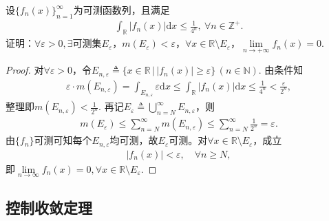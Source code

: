 \documentclass[../../main.tex]{subfiles}%
\begin{document}
\begin{example}
设$\{f_n(x)\}_{n=1}^{\infty}$为可测函数列，且满足
\begin{align*}
\int_{\mathbb{R}} |f_n(x)| \mathrm{d}x \leqslant \frac{1}{4^n},\ \forall n\in \mathbb{Z}^+.
\end{align*}
证明：$\forall \varepsilon>0,\exists$可测集$E_\varepsilon$，$m(E_\varepsilon)<\varepsilon$，$\forall x\in \mathbb{R}\setminus E_\varepsilon$，$\lim\limits_{n\to+\infty} f_n(x)=0.$
\end{example}
\begin{proof}

对$\forall \varepsilon>0$，令$E_{n,\varepsilon}\triangleq \big\{x\in\mathbb{R}\,\big|\,|f_n(x)|\geqslant \varepsilon\big\}\,(n\in\mathbb{N}).$
由条件知
\begin{align*}
\varepsilon\cdot m(E_{n,\varepsilon})=\int_{E_{n,\varepsilon}} \varepsilon \mathrm{d}x \leqslant \int_{\mathbb{R}} |f_n(x)|\mathrm{d}x \leqslant \frac{1}{4^n}<\frac{\varepsilon}{2^n},
\end{align*}
整理即$m(E_{n,\varepsilon})<\frac{1}{2^n}.$
再记$E_\varepsilon\triangleq \bigcup\limits_{n=N}^{\infty}E_{n,\varepsilon}$，则
\begin{align*}
m(E_\varepsilon)\leqslant \sum\limits_{n=N}^{\infty}m(E_{n,\varepsilon})\leqslant \sum\limits_{n=N}^{\infty}\frac{1}{2^n}=\varepsilon.
\end{align*}
由$\{f_n\}$可测可知每个$E_{n,\varepsilon}$均可测，故$E_\varepsilon$可测。对$\forall x\in \mathbb{R}\setminus E_\varepsilon$，成立
\begin{align*}
|f_n(x)|<\varepsilon,\quad \forall n\geqslant N,
\end{align*}
即$\lim\limits_{n\to\infty} f_n(x)=0,\forall x\in \mathbb{R}\setminus E_\varepsilon.$
\end{proof}



\subsection{控制收敛定理}
\end{document}
